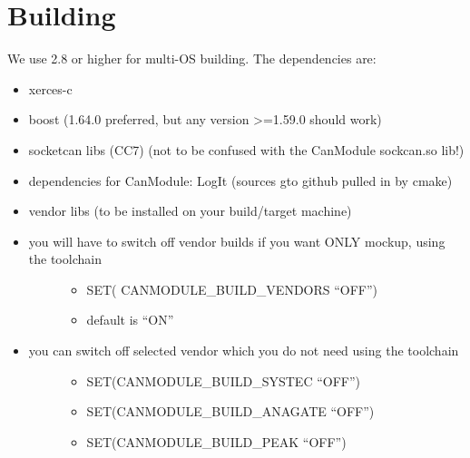 \documentclass[letterpaper,10pt,english]{sphinxmanual}
\begin{document}
\chapter{Building}
\label{\detokenize{building:building}}\label{\detokenize{building::doc}}
We use  2.8 or higher for multi-OS building.
The dependencies are:
\begin{itemize}
\item {} 
xerces-c

\item {} 
boost (1.64.0 preferred, but any version \textgreater{}=1.59.0 should work)

\item {} 
socketcan libs (CC7) (not to be confused with the CanModule sockcan.so lib!)

\item {} 
dependencies for CanModule: LogIt (sources gto github pulled in by cmake)

\item {} 
vendor libs (to be installed on your build/target machine)

\item {} \begin{description}
\item[{you will have to switch off vendor builds if you want ONLY mockup, using the toolchain}] \leavevmode\begin{itemize}
\item {} 
SET( CANMODULE\_BUILD\_VENDORS “OFF”)

\item {} 
default is “ON”

\end{itemize}

\end{description}

\item {} \begin{description}
\item[{you can switch off selected vendor which you do not need using the toolchain}] \leavevmode\begin{itemize}
\item {} 
SET(CANMODULE\_BUILD\_SYSTEC “OFF”)

\item {} 
SET(CANMODULE\_BUILD\_ANAGATE “OFF”)

\item {} 
SET(CANMODULE\_BUILD\_PEAK “OFF”)

\end{itemize}

\end{description}

\end{itemize}
\end{document}
